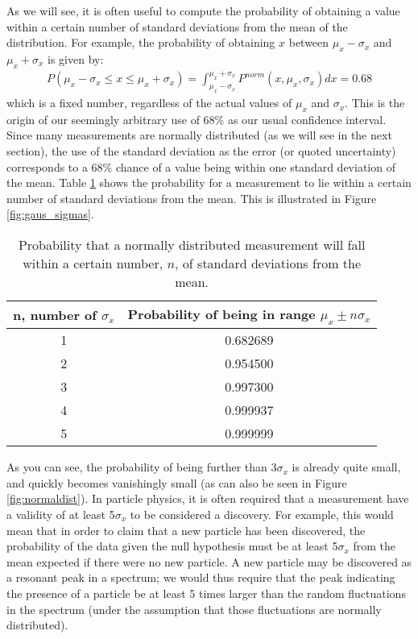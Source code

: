 As we will see, it is often useful to compute the probability of obtaining a value within a certain number of standard deviations from the mean of the distribution. For example, the probability of obtaining $x$ between $\mu_x-\sigma_x$ and $\mu_x+\sigma_x$ is given by:
 \begin{align}
P(\mu_x-\sigma_x \leq x \leq \mu_x+\sigma_x) = \int_{\mu_x-\sigma_x}^{\mu_x+\sigma_x}P^{norm}(x,\mu_x,\sigma_x)dx=0.68
\end{align}
which is a fixed number, regardless of the actual values of $\mu_x$ and $\sigma_x$. This is the origin of our seemingly arbitrary use of 68\% as our usual confidence interval. Since many measurements are normally distributed (as we will see in the next section), the use of the standard deviation as the error (or quoted uncertainty) corresponds to a 68\% chance of a value being within one standard deviation of the mean. Table \ref{tab:normsigma} shows the probability for a measurement to lie within a certain number of standard deviations from the mean. This is illustrated in Figure \ref{fig:gaus_sigmas}.
\begin{table}[h!]
\center
\begin{tabular}{|c|c|}
\hline
\textbf{n, number of $\sigma_x$} & \textbf{Probability of being in range $\mu_x\pm n\sigma_x$}\\
\hline
1 & 0.682689\\
2 & 0.954500\\
3 & 0.997300\\
4 & 0.999937\\
5 & 0.999999\\
\hline
\end{tabular}
\caption{\label{tab:normsigma}Probability that a normally distributed measurement will fall within a certain number, $n$, of standard deviations from the mean.}
\end{table}


As you can see, the probability of being further than 3$\sigma_x$ is already quite small, and quickly becomes vanishingly small (as can also be seen in Figure \ref{fig:normaldist}). In particle physics, it is often required that a measurement have a validity of at least 5$\sigma_x$ to be considered a discovery. For example, this would mean that in order to claim that a new particle has been discovered, the probability of the data given the null hypothesis must be at least 5$\sigma_x$ from the mean expected if there were no new particle. A new particle may be discovered as a resonant peak in a spectrum; we would thus require that the peak indicating the presence of a particle be at least 5 times larger than the random fluctuations in the spectrum (under the assumption that those fluctuations are normally distributed).

